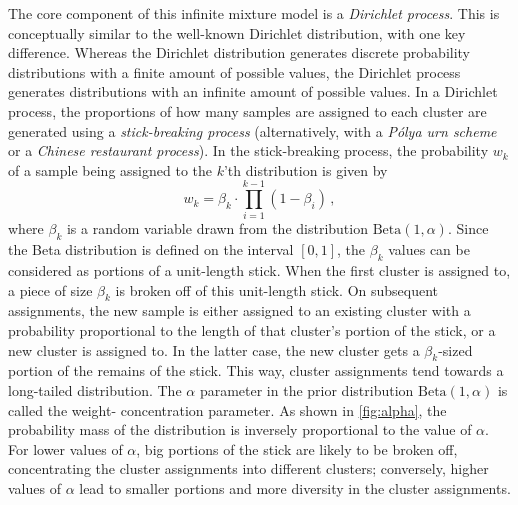 The core component of this infinite mixture model is a \emph{Dirichlet
process}. This is conceptually similar to the well-known Dirichlet
distribution, with one key difference. Whereas the Dirichlet distribution
generates discrete probability distributions with a finite amount of possible
values, the Dirichlet process generates distributions with an infinite amount
of possible values. In a Dirichlet process, the proportions of how many
samples are assigned to each cluster are generated using a
\emph{stick-breaking process} (alternatively, with a \emph{P\'{o}lya urn
scheme} or a \emph{Chinese restaurant process})\citep{dirichlet}. In the
stick-breaking process, the probability $w_k$ of a sample being assigned to the
$k$'th distribution is given by
\begin{equation}
  w_k = \beta_k \cdot \prod_{i=1}^{k-1} (1 - \beta_i)\,,
\end{equation}
where $\beta_k$ is a random variable drawn from the distribution
$\mathrm{Beta}(1, \alpha)$. Since the Beta distribution is defined on the
interval $\left[0, 1\right]$, the $\beta_k$ values can be considered as
portions of a unit-length stick. When the first cluster is assigned to, a
piece of size $\beta_k$ is broken off of this unit-length stick. On subsequent
assignments, the new sample is either assigned to an existing cluster with a
probability proportional to the length of that cluster's portion of the stick,
or a new cluster is assigned to. In the latter case, the new cluster gets a
$\beta_k$-sized portion of the remains of the stick. This way, cluster
assignments tend towards a long-tailed distribution. The $\alpha$ parameter in
the prior distribution $\mathrm{Beta}(1, \alpha)$ is called the
weight- concentration parameter. As shown in \cref{fig:alpha}, the probability
mass of the distribution is inversely proportional to the value of $\alpha$.
For lower values of $\alpha$, big portions of the stick are likely to be
broken off, concentrating the cluster assignments into different clusters;
conversely, higher values of $\alpha$ lead to smaller portions and more
diversity in the cluster assignments.

